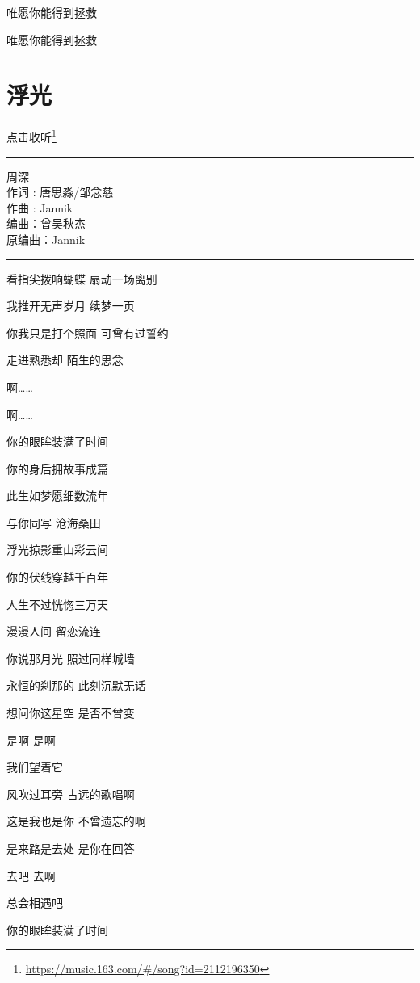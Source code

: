 \documentclass[]{ctexbook}
\renewcommand{\href}[2]{#2\footnote{\url{#1}}}
\begin{document}
唯愿你能得到拯救

唯愿你能得到拯救

\section*{浮光}\label{floating-light}


\href{https://music.163.com/\#/song?id=2112196350}{点击收听}

\begin{center}\rule{0.5\linewidth}{0.5pt}\end{center}

周深\\
作词 : 唐思淼/邹念慈\\
作曲 : Jannik\\
编曲：曾吴秋杰\\
原编曲：Jannik

\begin{center}\rule{0.5\linewidth}{0.5pt}\end{center}

看指尖拨响蝴蝶 扇动一场离别

我推开无声岁月 续梦一页

你我只是打个照面 可曾有过誓约

走进熟悉却 陌生的思念

啊\ldots\ldots{}

啊\ldots\ldots{}

你的眼眸装满了时间

你的身后拥故事成篇

此生如梦愿细数流年

与你同写 沧海桑田

浮光掠影重山彩云间

你的伏线穿越千百年

人生不过恍惚三万天

漫漫人间 留恋流连

你说那月光 照过同样城墙

永恒的刹那的 此刻沉默无话

想问你这星空 是否不曾变

是啊 是啊

我们望着它

风吹过耳旁 古远的歌唱啊

这是我也是你 不曾遗忘的啊

是来路是去处 是你在回答

去吧 去啊

总会相遇吧

你的眼眸装满了时间
\end{document}
